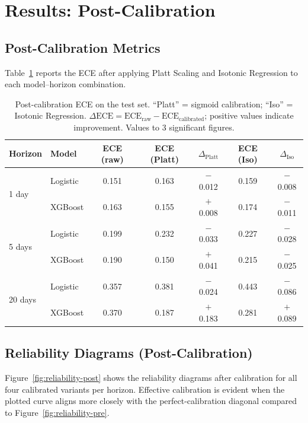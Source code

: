 \documentclass[12pt]{article}
\begin{document}
\section{Results: Post-Calibration}

\subsection{Post-Calibration Metrics}

Table~\ref{tab:post-calib} reports the ECE after applying Platt Scaling and
Isotonic Regression to each model--horizon combination.

\begin{table}[H]
\centering
\caption{Post-calibration ECE on the test set.
``Platt'' = sigmoid calibration; ``Iso'' = Isotonic Regression.
$\Delta\text{ECE} = \text{ECE}_\text{raw} - \text{ECE}_\text{calibrated}$;
positive values indicate improvement.
Values to 3 significant figures.}
\label{tab:post-calib}
\begin{tabular}{llccccc}
\toprule
Horizon & Model & ECE (raw) & ECE (Platt) & $\Delta_\text{Platt}$ & ECE (Iso) & $\Delta_\text{Iso}$ \\
\midrule
\multirow{2}{*}{1 day}
  & Logistic & 0.151 & 0.163 & $-$0.012 & 0.159 & $-$0.008 \\
  & XGBoost  & 0.163 & 0.155 & $+$0.008 & 0.174 & $-$0.011 \\
\midrule
\multirow{2}{*}{5 days}
  & Logistic & 0.199 & 0.232 & $-$0.033 & 0.227 & $-$0.028 \\
  & XGBoost  & 0.190 & 0.150 & $+$0.041 & 0.215 & $-$0.025 \\
\midrule
\multirow{2}{*}{20 days}
  & Logistic & 0.357 & 0.381 & $-$0.024 & 0.443 & $-$0.086 \\
  & XGBoost  & 0.370 & 0.187 & $+$0.183 & 0.281 & $+$0.089 \\
\bottomrule
\end{tabular}
\end{table}

\subsection{Reliability Diagrams (Post-Calibration)}

Figure~\ref{fig:reliability-post} shows the reliability diagrams after calibration
for all four calibrated variants per horizon.
Effective calibration is evident when the plotted curve aligns more closely with
the perfect-calibration diagonal compared to Figure~\ref{fig:reliability-pre}.
\end{document}
